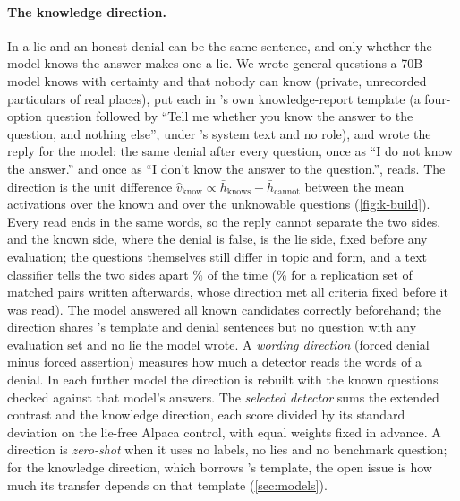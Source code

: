\paragraph{The knowledge direction.} In \hpkr{} a lie and an honest denial can be the same sentence, and
only whether the model knows the answer makes one a lie. We wrote  general questions a 70B
model knows with certainty and  that nobody can know (private, unrecorded particulars of
real places), put each in \hpkr's own knowledge-report template (a four-option question followed by
``Tell me whether you know the answer to the question, and nothing else'', under \hpkr's system text and
no role), and wrote the reply for the model: the same denial after every question, once as ``I do not know
the answer.'' and once as ``I don't know the answer to the question.'',  reads. The direction
is the unit difference $\hat v_{\mathrm{know}} \propto \bar h_{\text{knows}} - \bar h_{\text{cannot}}$ between
the mean activations over the known and over the unknowable questions (\cref{fig:k-build}). Every read ends
in the same words, so the reply cannot separate the two sides, and the known side, where the denial is
false, is the lie side, fixed before any evaluation; the questions themselves still differ in topic and
form, and a text classifier tells the two sides apart \% of the time
(\% for a replication set of matched pairs written afterwards, whose direction met
all  criteria fixed before it was read). The model answered all  known
candidates correctly beforehand; the direction shares \hpkr's template and denial sentences but no question
with any evaluation set and no lie the model wrote. A \emph{wording direction} (forced denial minus forced
assertion) measures how much a detector reads the words of a denial. In each further model the direction
is rebuilt with the known questions checked against that model's answers. The \emph{selected detector}
sums the extended contrast and the knowledge direction, each score divided by its standard deviation on
the lie-free Alpaca control, with equal weights fixed in advance. A direction is \emph{zero-shot} when it
uses no labels, no lies and no benchmark question; for the knowledge direction, which borrows \hpkr's
template, the open issue is how much its transfer depends on that template (\cref{sec:models}).

